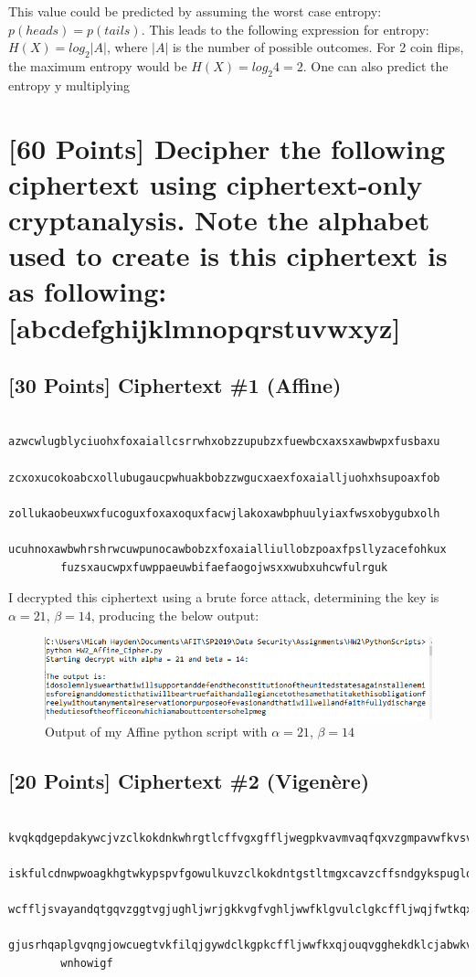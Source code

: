 \documentclass{article}
\begin{document}
\begin{enumerate}
This value could be predicted by assuming the worst case entropy:  $p(heads) = p(tails)$.
This leads to the following expression for entropy:  $H(X) = log_2|A|$, where $|A|$ is the number of possible outcomes.
For 2 coin flips, the maximum entropy would be $H(X) = log_2 4 = 2$.
One can also predict the entropy y multiplying 
    \end{enumerate}

    \section*{[60 Points] Decipher the following ciphertext using ciphertext-only cryptanalysis. Note the alphabet used to create is this ciphertext is as following: [abcdefghijklmnopqrstuvwxyz]}

    \subsection*{[30 Points] Ciphertext \#1 (Affine)}
    \begin{verbatim}
        azwcwlugblyciuohxfoxaiallcsrrwhxobzzupubzxfuewbcxaxsxawbwpxfusbaxu
        zcxoxucokoabcxollubugaucpwhuakbobzzwgucxaexfoxaialljuohxhsupoaxfob
        zollukaobeuxwxfucoguxfoxaxoquxfacwjlakoxawbphuulyiaxfwsxobygubxolh
        ucuhnoxawbwhrshrwcuwpunocawbobzxfoxaialliullobzpoaxfpsllyzacefohkux
        fuzsxaucwpxfuwppaeuwbifaefaogojwsxxwubxuhcwfulrguk
    \end{verbatim}

I decrypted this ciphertext using a brute force attack, determining the key is $\alpha = 21$, $\beta = 14$, producing the below output:

\begin{figure}[h!]
\centering
\includegraphics[scale=1.0]{Images/run_Affine.PNG}
\caption{Output of my Affine python script with $\alpha = 21$, $\beta = 14$}
\label{fig:affineOut}
\end{figure}

    \subsection*{[20 Points] Ciphertext \#2 (Vigen\`{e}re)}
    \begin{verbatim}
        kvqkqdgepdakywcjvzclkokdnkwhrgtlcffvgxgffljwegpkvavmvaqfqxvzgmpavwfkvsvwus
        iskfulcdnwpwoagkhgtwkypspvfgowulkuvzclkokdntgstltmgxcavzcffsndgykspuglqljwuso
        wcffljsvayandqtgqvzggtvgjughljwrjgkkvgfvghljwwfklgvulclgkcffljwqjfwtkqxvzgghxku
        gjusrhqaplgvqngjowcuegtvkfilqjgywdclkgpkcffljwwfkxqjouqvgghekdklcjabwkvaewugj
        wnhowigf
    \end{verbatim}
\end{document}
